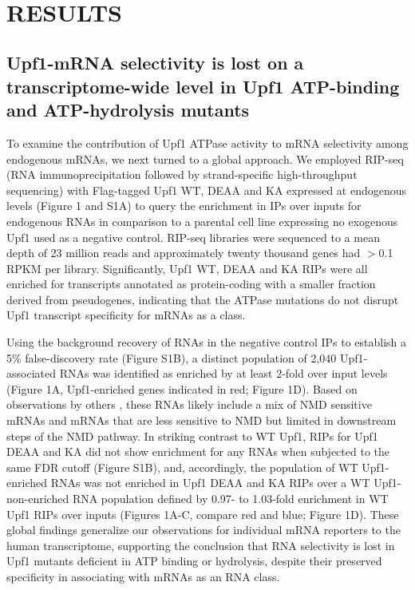  
\section{RESULTS}

\subsection{Upf1-mRNA selectivity is lost on a transcriptome-wide level in Upf1 ATP-binding and ATP-hydrolysis mutants}
To examine the contribution of Upf1 ATPase activity to mRNA selectivity among endogenous mRNAs, we next turned to a global approach. We employed RIP-seq (RNA immunoprecipitation followed by strand-specific high-throughput sequencing) with Flag-tagged Upf1 WT, DEAA and KA expressed at endogenous levels (Figure 1 and S1A) to query the enrichment in IPs over inputs for endogenous RNAs in comparison to a parental cell line expressing no exogenous Upf1 used as a negative control. RIP-seq libraries were sequenced to a mean depth of 23 million reads and approximately twenty thousand genes had $>$0.1 RPKM per library. Significantly, Upf1 WT, DEAA and KA RIPs were all enriched for transcripts annotated as protein-coding with a smaller fraction derived from pseudogenes, indicating that the ATPase mutations do not disrupt Upf1 transcript specificity for mRNAs as a class.

Using the background recovery of RNAs in the negative control IPs to establish a 5\% false-discovery rate (Figure S1B), a distinct population of 2,040 Upf1-associated RNAs was identified as enriched by at least 2-fold over input levels (Figure 1A, Upf1-enriched genes indicated in red; Figure 1D). Based on observations by others \cite{Hogg2010, Kurosaki2014, Zund2013}, these RNAs likely include a mix of NMD sensitive mRNAs and mRNAs that are less sensitive to NMD but limited in downstream steps of the NMD pathway. In striking contrast to WT Upf1, RIPs for Upf1 DEAA and KA did not show enrichment for any RNAs when subjected to the same FDR cutoff (Figure S1B), and, accordingly, the population of WT Upf1-enriched RNAs was not enriched in Upf1 DEAA and KA RIPs over a WT Upf1-non-enriched RNA population defined by 0.97- to 1.03-fold enrichment in WT Upf1 RIPs over inputs (Figures 1A-C, compare red and blue; Figure 1D). These global findings generalize our observations for individual mRNA reporters to the human transcriptome, supporting the conclusion that RNA selectivity is lost in Upf1 mutants deficient in ATP binding or hydrolysis, despite their preserved specificity in associating with mRNAs as an RNA class.


